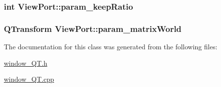 \label{classViewPort_a023381fa2838df1c3ef3a9183f4abbd1}
\hypertarget{classViewPort_a2ad627e7c8f030da5b252cfbb056164b}{
\subsubsection[{param\_\-keepRatio}]{\setlength{\rightskip}{0pt plus 5cm}int {\bf ViewPort::param\_\-keepRatio}}}
\label{classViewPort_a2ad627e7c8f030da5b252cfbb056164b}
\hypertarget{classViewPort_a4404db6e34a91d2e2e4c5026840a2adc}{
\subsubsection[{param\_\-matrixWorld}]{\setlength{\rightskip}{0pt plus 5cm}QTransform {\bf ViewPort::param\_\-matrixWorld}}}
\label{classViewPort_a4404db6e34a91d2e2e4c5026840a2adc}


The documentation for this class was generated from the following files:\begin{DoxyCompactItemize}
\item 
\hyperlink{window__QT_8h}{window\_\-QT.h}\item 
\hyperlink{window__QT_8cpp}{window\_\-QT.cpp}\end{DoxyCompactItemize}
